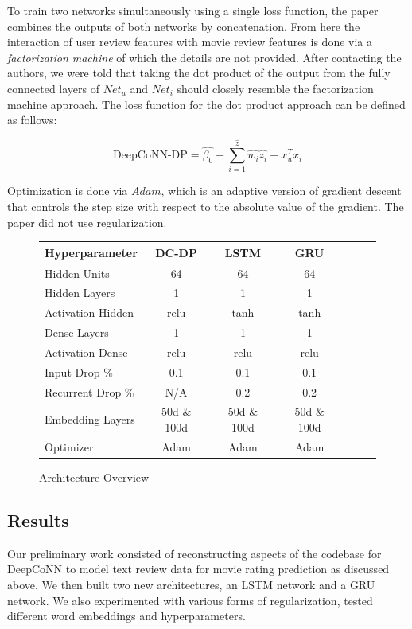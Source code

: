 \documentclass[10pt,twocolumn,letterpaper]{article}
\begin{document}
To train two networks simultaneously using a single loss function, the paper combines the outputs of both networks by concatenation. From here the interaction of user review features with movie review features is done via a \textit{factorization machine} of which the details are not provided. After contacting the authors, we were told that taking the dot product of the output from the fully connected layers of $Net_{u}$ and $Net_{i}$ should closely resemble the factorization machine approach. The loss function for the dot product approach can be defined as follows:

$$
\mbox{DeepCoNN-DP} = \hat{\beta_{0}} + \sum_{i=1}^{\hat{z}}\hat{w_{i}}\hat{z_{i}} + x^{T}_{u}x_{i}
$$

Optimization is done via $Adam$, which is an adaptive version of gradient descent that controls the step size with respect to the absolute value of the gradient. The paper did not use regularization.

\begin{figure}[!ht]
\begin{center}
{\small
\begin{tabular}{l|cccccc}
\hline
Hyperparameter & DC-DP & LSTM & GRU  \\
\hline
Hidden Units & 64 & 64 & 64 \\
Hidden Layers & 1 & 1 & 1 \\
Activation Hidden & relu & tanh &  tanh \\
Dense Layers & 1 & 1 & 1 \\
Activation Dense & relu & relu &  relu \\
Input Drop \% & 0.1 & 0.1 & 0.1 & \\
Recurrent Drop \% & N/A & 0.2 & 0.2 & \\
Embedding Layers & 50d \& 100d & 50d \& 100d & 50d \& 100d \\
Optimizer & Adam & Adam &  Adam \\
\hline

\end{tabular}
}
\end{center}
\caption{Architecture Overview}
\end{figure}

\subsection{Results}

Our preliminary work consisted of reconstructing aspects of the codebase for DeepCoNN to model text review data for movie rating prediction as discussed above. We then built two new architectures, an LSTM network and a GRU network. We also experimented with various forms of regularization, tested different word embeddings and hyperparameters.
\end{document}
